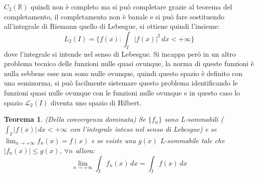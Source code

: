 \documentclass[12pt]{book}
\theoremstyle{plain}
\newcommand{\R}{\mathbb{R}}
\newtheorem{thm}{Teorema}[section]
\theoremstyle{definition}
\theoremstyle{remark}
\begin{document}
$C_2(\R)$ quindi non è completo ma si può completare grazie al teorema del completamento, il completamento non è banale e si può fare sostituendo all'integrale di Riemann quello di Lebesgue, si ottiene quindi l'insieme:
\[L_2(I) = \{f(x):\int_I|f(x)|^2\,dx<+\infty\} \]
dove l'integrale si intende nel senso di Lebesgue. Si incappa però in un altro problema tecnico delle funzioni nulle quasi ovunque, la norma di queste funzioni è nulla sebbene esse non sono nulle ovunque, quindi questo spazio è definito con una seminorma, si può facilmente sistemare questo problema identificando le funzioni quasi nulle ovunque con le funzioni nulle ovunque e in questo caso lo spazio $\mathcal{L}_2(I)$ diventa uno spazio di Hilbert.
\begin{thm}(Della convergenza dominata)
Se $\{f_n\}$ sono L-sommabili ($\int_I|f(x)|\,dx<+\infty$ con l'integrale inteso nel senso di Lebesgue) e se $\displaystyle\lim_{n\to+\infty} f_n(x) = f(x)$ e se esiste una $g(x)$ L-sommabile tale che $|f_n(x)|\leq g(x)$, $\forall n$ allora:
\[\lim_{n\to+\infty} \int_I f_n(x)\,dx = \int_I f(x)\,dx\]
\end{thm}
\end{document}
